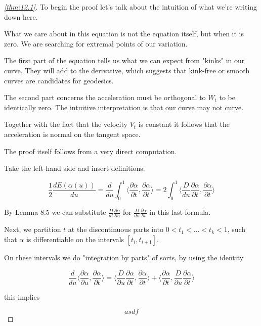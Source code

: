 \documentclass{article}
\newtheorem{proof}{Proof}
\newcommand{\angle}[1]{\langle #1 \rangle}
\begin{document}
\begin{proof}[\ref{thm:12.1}]
    To begin the proof let's talk about the intuition of what we're writing down here.

    What we care about in this equation is not the equation itself, but when it is zero. We are
    searching for extremal points of our variation.

    The first part of the equation tells us what we can expect from "kinks" in our curve. They will
    add to the derivative, which suggests that kink-free or smooth curves are candidates for
    geodesics.

    The second part concerns the acceleration must be orthogonal to $W_t$ to be identically zero.
    The intuitive interpretation is that our curve may not curve.

    Together with the fact that the velocity $V_t$ is constant it follows that the acceleration is
    normal on the tangent space.


    The proof itself follows from a very direct computation.


    Take the left-hand side and insert definitions.

    \[
        \frac{1}{2} \frac{dE(\alpha(u))}{du} =
        \frac{d}{du} \int_0^1 \angle{\frac{\partial \alpha}{\partial t}, \frac{\partial \alpha}{\partial t}} =
        2 \int_0^1 \angle{\frac{D}{du} \frac{\partial \alpha}{\partial t}, \frac{\partial \alpha}{\partial t}}
    \]

    By Lemma 8.5 we can substitute
    $\frac{D}{dt} \frac{\partial \alpha}{\partial u}$ for
    $\frac{D}{du} \frac{\partial \alpha}{\partial t}$ in this last formula.

    Next, we partition $t$ at the discontinuous parts into $0 \lt t_1 \lt \ldots \lt t_k \lt 1$,
    such that $\alpha$ is differentiable on the intervals $[t_i, t_{i+1}]$.

    On these intervals we do "integration by parts" of sorts, by using the identity

    \[
        \frac{d}{du} \angle{\frac{\partial \alpha}{\partial u}, \frac{\partial \alpha}{\partial t}} =
        \angle{\frac{D}{\partial u} \frac{\partial \alpha}{\partial t}, \frac{\partial \alpha}{\partial t}}
        +
        \angle{\frac{\partial \alpha}{\partial t}, \frac{D}{\partial u} \frac{\partial \alpha}{\partial t}}
    \]

    this implies

    \[
        asdf
    \]

\end{proof}
\end{document}
